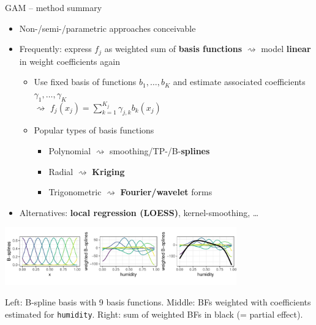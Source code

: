 \begin{frame2}{GAM -- method summary}


\begin{itemize}
  \item Non-/semi-/parametric approaches conceivable
  \item Frequently: express $f_j$ as weighted sum of \textbf{basis functions}
  $\rightsquigarrow$ model \textbf{linear} in weight coefficients again
  \begin{itemize}
      \item Use fixed basis of functions $b_1, \dots, b_K$ and estimate
      associated coefficients $\gamma_1, \dots, \gamma_K$ \\ $\rightsquigarrow$
      $f_j(x_j) = \textstyle \sum_{k=1}^{K_j} \gamma_{j, k} b_k(x_j)$
      \item Popular types of basis functions
      \begin{itemize}
        \item Polynomial $\rightsquigarrow$ smoothing/TP-/B-\textbf{splines}
        \item Radial $\rightsquigarrow$ \textbf{Kriging}
        \item Trigonometric $\rightsquigarrow$ \textbf{Fourier/wavelet} forms
      \end{itemize}
    \end{itemize}
    \item Alternatives: \textbf{local regression (LOESS)},
    kernel-smoothing, \dots
\end{itemize}

\includegraphics[width=0.75\textwidth]{figure/gam_bike_spline_basis}

\small
Left: B-spline basis with 9 basis functions.
Middle: BFs weighted with coefficients estimated for
\texttt{humidity}.
Right: sum of weighted BFs in black (= partial effect).

\end{frame2}

